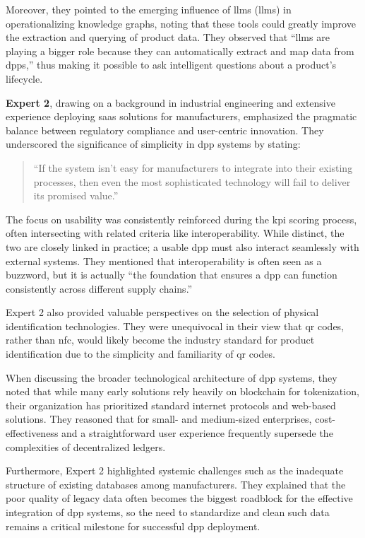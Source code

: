 Moreover, they pointed to the emerging influence of \acrlong{llm}s (\acrshort{llm}s) in operationalizing knowledge graphs, noting that these tools could greatly improve the extraction and querying of product data. They observed that ``\ac{llm}s are playing a bigger role because they can automatically extract and map data from \ac{dpp}s,'' thus making it possible to ask intelligent questions about a product’s lifecycle.

\textbf{Expert 2}, drawing on a background in industrial engineering and extensive experience deploying \ac{saas} solutions for manufacturers, emphasized the pragmatic balance between regulatory compliance and user-centric innovation. They underscored the significance of simplicity in \ac{dpp} systems by stating:

\begin{quote}
    ``If the system isn't easy for manufacturers to integrate into their existing processes, then even the most sophisticated technology will fail to deliver its promised value.''
\end{quote}

The focus on usability was consistently reinforced during the \ac{kpi} scoring process, often intersecting with related criteria like interoperability. While distinct, the two are closely linked in practice; a usable \ac{dpp} must also interact seamlessly with external systems. They mentioned that interoperability is often seen as a buzzword, but it is actually ``the foundation that ensures a \ac{dpp} can function consistently across different supply chains.''

Expert 2 also provided valuable perspectives on the selection of physical identification technologies. They were unequivocal in their view that \ac{qr} codes, rather than \ac{nfc}, would likely become the industry standard for product identification due to the simplicity and familiarity of \ac{qr} codes.

When discussing the broader technological architecture of \ac{dpp} systems, they noted that while many early solutions rely heavily on blockchain for tokenization, their organization has prioritized standard internet protocols and web-based solutions. They reasoned that for small- and medium-sized enterprises, cost-effectiveness and a straightforward user experience frequently supersede the complexities of decentralized ledgers.

Furthermore, Expert 2 highlighted systemic challenges such as the inadequate structure of existing databases among manufacturers. They explained that the poor quality of legacy data often becomes the biggest roadblock for the effective integration of \ac{dpp} systems, so the need to standardize and clean such data remains a critical milestone for successful \ac{dpp} deployment.

